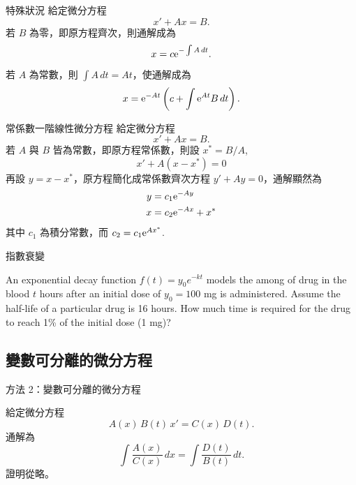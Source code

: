 \documentclass{beamer}
\newcommand  {\e}{\textup e}
\newcommand{\negskip}{\vskip -2em plus 3pt minus 3pt}
\theoremstyle{remark}
\begin{document}
\begin{CJK}{UTF8}{bsmi}
\begin{frame}{特殊狀況}
  給定微分方程
  \[x' + Ax = B.\]
  若 $B$ 為零，即原方程齊次，則通解成為
  \[x = c\e^{-\int A\,dt}.\]
  若 $A$ 為常數，則 $\int A\,dt = At$，使通解成為
  \[x = \e^{-At} \left( c + \int \e^{At} B\,dt \right).\]
\end{frame}

\begin{frame}{常係數一階線性微分方程}
  給定微分方程
  \[x' + Ax = B.\]
  若 $A$ 與 $B$ 皆為常數，即原方程常係數，則設 $x^* = B/A$,
  \[x' + A \left( x - x^* \right) = 0\]
  再設 $y = x - x^*$，原方程簡化成常係數齊次方程
  $y' + Ay = 0$，通解顯然為
  \begin{align*}
    y &= c_1 \e^{-Ay} \\
    x &= c_2 \e^{-Ax} + x^*
  \end{align*}
  其中 $c_1$ 為積分常數，而 $c_2 = c_1 \e^{Ax^*}$.
\end{frame}

\begin{frame}{指數衰變}
  \begin{example}
    An exponential decay function $f(t) = y_0 e^{-kt}$ models the among of drug in the blood $t$ hours after an initial
    dose of $y_0 = 100$ mg is administered. Assume the half-life of a particular drug is 16 hours. How much time is
    required for the drug to reach 1\% of the initial dose (1 mg)?
  \end{example}
\end{frame}

\subsection[變數可分離]{變數可分離的微分方程}
\begin{frame}{方法 2：變數可分離的微分方程}
  \begin{theorem}
    給定微分方程
    \[A(x)\,B(t)\,x' = C(x)\,D(t).\]
    通解為
    \[\int \frac{A(x)}{C(x)}\,dx = \int \frac{D(t)}{B(t)}\,dt.\]
    證明從略。
  \end{theorem}
\end{frame}


\end{CJK}
\end{document}
